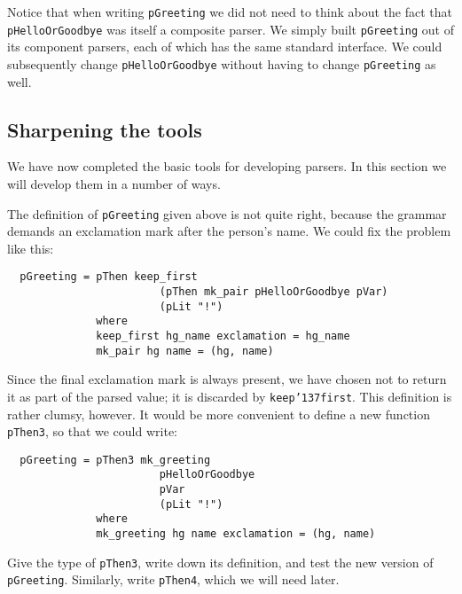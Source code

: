 Notice that when writing \mbox{\tt pGreeting} we did not need to think about
the fact that \mbox{\tt pHelloOrGoodbye} was itself a composite parser.  We simply
built \mbox{\tt pGreeting} out of its component parsers, each of which has the same
standard interface.   We could subsequently change \mbox{\tt pHelloOrGoodbye} without
having to change \mbox{\tt pGreeting} as well.

\subsection{Sharpening the tools}

We have now completed the basic tools for developing parsers.
In this section we will develop them in a number of ways.

The definition of \mbox{\tt pGreeting} given above is not quite right, because the
grammar demands an exclamation mark
after the person's name. We could fix the
problem like this:
\begin{verbatim}
  pGreeting = pThen keep_first
                        (pThen mk_pair pHelloOrGoodbye pVar)
                        (pLit "!")
              where
              keep_first hg_name exclamation = hg_name
              mk_pair hg name = (hg, name)
\end{verbatim}
Since the final exclamation mark is always present, we have chosen not
to return it as part of the parsed value; it is discarded by \mbox{\tt keep{\char'137}first}.
This definition is rather clumsy, however.  It would be more convenient to
define a new function \mbox{\tt pThen3}, so that we could write:
\begin{verbatim}
  pGreeting = pThen3 mk_greeting
                        pHelloOrGoodbye
                        pVar
                        (pLit "!")
              where
              mk_greeting hg name exclamation = (hg, name)
\end{verbatim}
\begin{exercise}
\label{ex:pThen}
Give the type of \mbox{\tt pThen3}, write down its definition, and test the new
version of \mbox{\tt pGreeting}.  Similarly, write \mbox{\tt pThen4}, which we will need later.
\end{exercise}

